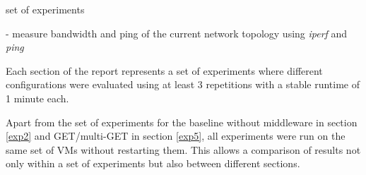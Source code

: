 \documentclass[report.tex]{subfiles}
\begin{document}
\begin{algorithm}
	\scriptsize{
	\ForEach
	{
		set of experiments
	}{
		- measure bandwidth and ping of the current network topology using \emph{iperf} and \emph{ping}
		
	}}
	\caption{Each section of the report represents a set of experiments where different configurations were evaluated using at least 3 repetitions with a stable runtime of 1 minute each.}\label{exp-suite-algo}
\end{algorithm}

Apart from the set of experiments for the baseline without middleware in section \ref{exp2} and GET/multi-GET in section \ref{exp5}, all experiments were run on the same set of VMs without restarting them. This allows a comparison of results not only within a set of experiments but also between different sections.
\end{document}

